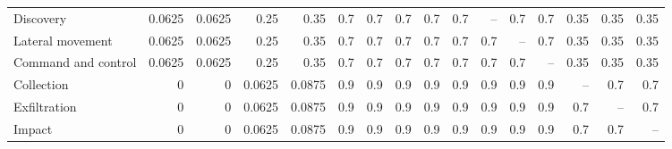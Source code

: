 \begin{table}[htbp]
\begin{tabular}{@{}lrrrrrrrrrrrrrrr@{}}
Discovery & 0.0625 & 0.0625 & 0.25 & 0.35 & 0.7 & 0.7 & 0.7 & 0.7 & 0.7 & -- & 0.7 & 0.7 & 0.35 & 0.35 & 0.35 \\
Lateral movement & 0.0625 & 0.0625 & 0.25 & 0.35 & 0.7 & 0.7 & 0.7 & 0.7 & 0.7 & 0.7 & -- & 0.7 & 0.35 & 0.35 & 0.35 \\
Command and control & 0.0625 & 0.0625 & 0.25 & 0.35 & 0.7 & 0.7 & 0.7 & 0.7 & 0.7 & 0.7 & 0.7 & -- & 0.35 & 0.35 & 0.35 \\
\addlinespace[2pt]
Collection & 0 & 0 & 0.0625 & 0.0875 & 0.9 & 0.9 & 0.9 & 0.9 & 0.9 & 0.9 & 0.9 & 0.9 & -- & 0.7 & 0.7 \\
Exfiltration & 0 & 0 & 0.0625 & 0.0875 & 0.9 & 0.9 & 0.9 & 0.9 & 0.9 & 0.9 & 0.9 & 0.9 & 0.7 & -- & 0.7 \\
Impact & 0 & 0 & 0.0625 & 0.0875 & 0.9 & 0.9 & 0.9 & 0.9 & 0.9 & 0.9 & 0.9 & 0.9 & 0.7 & 0.7 & -- \\
\bottomrule
\end{tabular}
\end{table}
